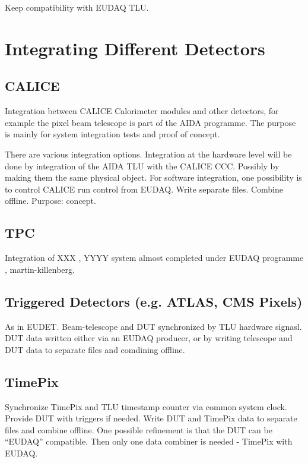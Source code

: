 Keep compatibility with EUDAQ TLU.\cite{ref:eudaq_tlu_manual}

\section{Integrating Different Detectors }

\subsection{CALICE}

Integration between CALICE Calorimeter modules and other detectors,
for example the pixel beam telescope is part of the AIDA
programme. The purpose is mainly for system integration tests and
proof of concept.

There are various integration options. Integration at the hardware level will be done by integration of the AIDA TLU with the CALICE CCC. Possibly by making them the same physical object. For software integration, one possibility\cite{ref:vincentb_aida_llr_nov11} is to 
control CALICE run control from EUDAQ. Write separate files. Combine
offline. Purpose: 
concept.

\subsection{TPC}

Integration of XXX , YYYY system almost completed under EUDAQ
programme\cite{ulf} , martin-killenberg.

\subsection{Triggered Detectors (e.g. ATLAS, CMS Pixels)}

As in EUDET. Beam-telescope and DUT synchronized by TLU hardware
signasl. DUT data written either via an EUDAQ producer, or by writing
telescope and DUT data to separate files and comdining offline.

\subsection{TimePix}

Synchronize TimePix and TLU timestamp counter via common system
clock. Provide DUT with triggers if needed. Write DUT and TimePix data
to separate files and combine offline. One possible
refinement\cite{ref:daniel_hyndes} is that the DUT can be ``EUDAQ''
compatible. Then only one data combiner is needed - TimePix with
EUDAQ.



